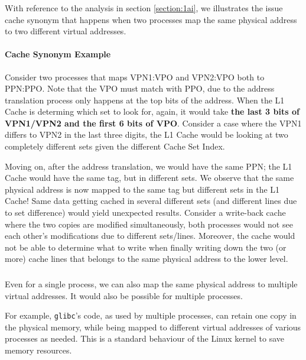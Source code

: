 \documentclass[12pt]{article}
\begin{document}
\subsubsection{}

With reference to the analysis in section \ref{section:1ai}, we illustrates the issue cache synonym that happens when two processes map the same physical address to two different virtual addresses.

\paragraph*{Cache Synonym Example}

Consider two processes that maps VPN1:VPO and VPN2:VPO both to PPN:PPO. Note that the VPO must match with PPO, due to the address translation process only happens at the top bits of the address. When the L1 Cache is determing which set to look for, again, it would take \textbf{the last 3 bits of VPN1/VPN2 and the first 6 bits of VPO}. Consider a case where the VPN1 differs to VPN2 in the last three digits, the L1 Cache would be looking at two completely different sets given the different Cache Set Index.

Moving on, after the address translation, we would have the same PPN; the L1 Cache would have the same tag, but in different sets. We observe that the same physical address is now mapped to the same tag but different sets in the L1 Cache! Same data getting cached in several different sets (and different lines due to set difference) would yield unexpected results. Consider a write-back cache where the two copies are modified simultaneously, both processes would not see each other's modifications due to different sets/lines. Moreover, the cache would not be able to determine what to write when finally writing down the two (or more) cache lines that belongs to the same physical address to the lower level.

\subsubsection{}

Even for a single process, we can also map the same physical address to multiple virtual addresses. It would also be possible for multiple processes.

For example, \texttt{glibc}'s code, as used by multiple processes, can retain one copy in the physical memory, while being mapped to different virtual addresses of various processes as needed. This is a standard behaviour of the Linux kernel to save memory resources.
\end{document}
